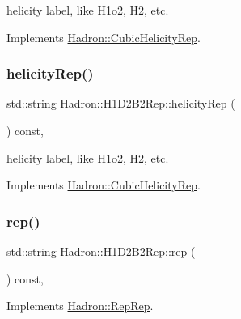 helicity label, like H1o2, H2, etc. 

Implements \mbox{\hyperlink{structHadron_1_1CubicHelicityRep_af1096946b7470edf0a55451cc662f231}{Hadron\+::\+Cubic\+Helicity\+Rep}}.

\mbox{\label{structHadron_1_1H1D2B2Rep_a062fbbb46713530665aa762d773fa6f6}} 
\subsubsection{\texorpdfstring{helicityRep()}{helicityRep()}\hspace{0.1cm}{\footnotesize\ttfamily [3/3]}}
{\footnotesize\ttfamily std\+::string Hadron\+::\+H1\+D2\+B2\+Rep\+::helicity\+Rep (\begin{DoxyParamCaption}{ }\end{DoxyParamCaption}) const\hspace{0.3cm}{\ttfamily [inline]}, {\ttfamily [virtual]}}

helicity label, like H1o2, H2, etc. 

Implements \mbox{\hyperlink{structHadron_1_1CubicHelicityRep_af1096946b7470edf0a55451cc662f231}{Hadron\+::\+Cubic\+Helicity\+Rep}}.

\mbox{\label{structHadron_1_1H1D2B2Rep_a12878ffcfbf3732a19b7b27407e4b026}} 
\subsubsection{\texorpdfstring{rep()}{rep()}\hspace{0.1cm}{\footnotesize\ttfamily [1/5]}}
{\footnotesize\ttfamily std\+::string Hadron\+::\+H1\+D2\+B2\+Rep\+::rep (\begin{DoxyParamCaption}{ }\end{DoxyParamCaption}) const\hspace{0.3cm}{\ttfamily [inline]}, {\ttfamily [virtual]}}



Implements \mbox{\hyperlink{structHadron_1_1RepRep_ab3213025f6de249f7095892109575fde}{Hadron\+::\+Rep\+Rep}}.

\mbox{\label{structHadron_1_1H1D2B2Rep_a12878ffcfbf3732a19b7b27407e4b026}} 
